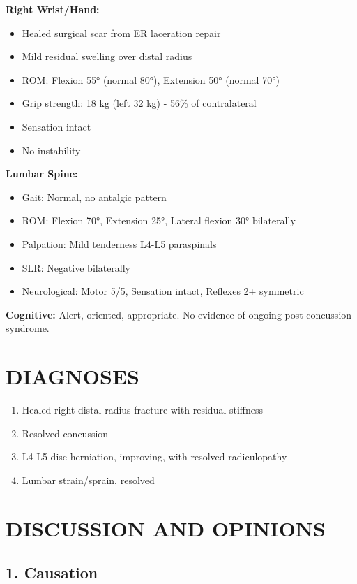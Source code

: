 \documentclass[11pt]{article}
\begin{document}
\textbf{Right Wrist/Hand:}
\begin{itemize}[nosep]
\item Healed surgical scar from ER laceration repair
\item Mild residual swelling over distal radius
\item ROM: Flexion 55° (normal 80°), Extension 50° (normal 70°)
\item Grip strength: 18 kg (left 32 kg) - 56\% of contralateral
\item Sensation intact
\item No instability
\end{itemize}

\textbf{Lumbar Spine:}
\begin{itemize}[nosep]
\item Gait: Normal, no antalgic pattern
\item ROM: Flexion 70°, Extension 25°, Lateral flexion 30° bilaterally
\item Palpation: Mild tenderness L4-L5 paraspinals
\item SLR: Negative bilaterally
\item Neurological: Motor 5/5, Sensation intact, Reflexes 2+ symmetric
\end{itemize}

\textbf{Cognitive:} Alert, oriented, appropriate. No evidence of ongoing post-concussion syndrome.

\section*{DIAGNOSES}

\begin{enumerate}
\item Healed right distal radius fracture with residual stiffness
\item Resolved concussion
\item L4-L5 disc herniation, improving, with resolved radiculopathy
\item Lumbar strain/sprain, resolved
\end{enumerate}

\section*{DISCUSSION AND OPINIONS}

\subsection*{1. Causation}
\end{document}
